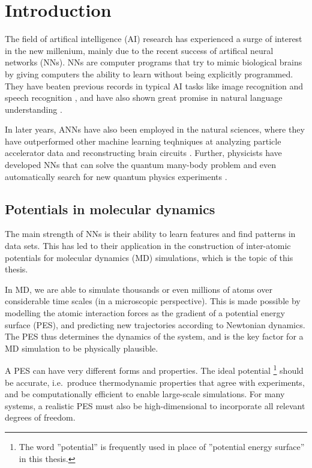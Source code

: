 \documentclass[twoside,english]{uiofysmaster}
\begin{document}
\tableofcontents

\chapter{Introduction}
The field of artifical intelligence (AI) research has experienced a surge of interest in 
the new millenium, mainly due to the recent success of artifical neural networks (NNs). 
NNs are computer programs that try to mimic biological brains
by giving computers the ability to learn without being explicitly programmed. 
They have beaten previous records in typical AI tasks like image recognition \cite{Krizhevsky12} and speech recognition
\cite{Hinton12}, and have also shown great promise in natural language understanding \cite{Collobert11}. 
 
In later years, ANNs have also been employed in the natural sciences, where they have outperformed other machine learning
teqhniques at analyzing particle accelerator data \cite{Ciodaro12} and reconstructing brain circuits
\cite{Helmstaedter13}. Further, physicists have developed NNs that can solve the quantum many-body problem
\cite{Carleo17} and even automatically search for new quantum physics experiments \cite{Krenn16}. 

\section{Potentials in molecular dynamics}
The main strength of NNs is their ability to learn features and find patterns in data sets. 
This has led to their application in the construction of inter-atomic potentials for molecular dynamics (MD) simulations, 
which is the topic of this thesis.

In MD, we are able to simulate thousands or even millions of atoms over considerable 
time scales (in a microscopic perspective). This is made possible by modelling the atomic interaction forces 
as the gradient of a potential energy surface (PES), and predicting new trajectories according 
to Newtonian dynamics. The PES thus determines the dynamics of the system, and is the 
key factor for a MD simulation to be physically plausible.

A PES can have very different forms and properties. The ideal potential%
\footnote{The word ''potential'' is frequently used in place of ''potential energy surface'' in this thesis.}
should be accurate, i.e.\ produce thermodynamic properties that agree with experiments, and be computationally 
efficient to enable large-scale simulations. For many systems, a realistic PES must also be high-dimensional to 
incorporate all relevant degrees of freedom.
\end{document}
